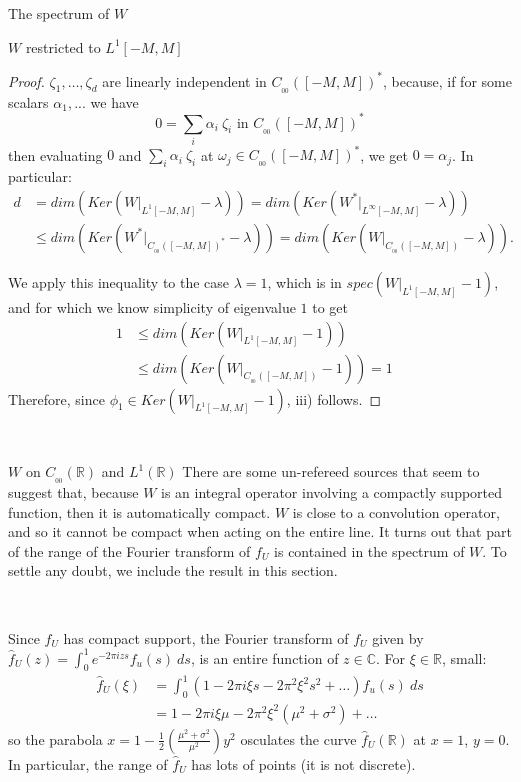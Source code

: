 \documentclass[12pt]{article}
\begin{document}
\begin{section}{The spectrum of $W$ }
\begin{subsection}{$W$ restricted to $L^1[-M,M]$ }
\begin{proof}
$\zeta_1,\dots,\zeta_d $ are linearly independent in $C_{_{00}}([-M,M])^*$, because, if for some scalars $\alpha_1,...$ we have
$$
0 = \sum_i \alpha_i \ \zeta_i \text{ in } C_{_{00}}([-M,M])^*
$$
then evaluating $0$ and $\sum_i \alpha_i \ \zeta_i$ at $\omega_j \in C_{_{00}}([-M,M])^*$, we get $0 = \alpha_j$. In particular:
\begin{align*}
d &= dim \left( Ker \left( W\Big|_{L^1[-M,M]} - \lambda \right) \right) 
= dim \left( Ker \left( W^* \Big|_{L^{\infty}[-M,M]} - \lambda \right) \right)  &\\
&\le dim \left( Ker \left( W^* \Big|_{C_{_{00}}([-M,M])^*} - \lambda \right) \right) 
= dim \left( Ker \left( W\Big|_{C_{_{00}}([-M,M])} - \lambda \right) \right). &
\end{align*}

We apply this inequality to the case $\lambda = 1$, which is in $spec\left( W\Big|_{L^1[-M,M]} - 1 \right)$, and for which we know simplicity of eigenvalue $1$ to get
\begin{align*}
1 &\le dim \left( Ker \left( W\Big|_{L^1[-M,M]} - 1 \right) \right)  &\\
&\le dim \left( Ker \left( W\Big|_{C_{_{00}}([-M,M])} - 1 \right) \right) = 1 &
\end{align*}
Therefore, since $\phi_1 \in Ker \left( W\Big|_{L^1[-M,M]} - 1 \right)$, iii) follows.
\end{proof}



\end{subsection}

\  
\  



\begin{subsection}{$W$ on $C_{_{0\!0}}(\mathbb{R})$ and $L^1(\mathbb{R})$} \label{W_whole_R}
There are some un-refereed sources that seem to suggest that, because $W$ is an integral operator involving a compactly supported function, then it is automatically compact. $W$ is close to a convolution operator, and so it cannot be compact when acting on the entire line. It turns out that part of the range of the Fourier transform of $f_U$ is contained in the spectrum of $W$. To settle any doubt, we include the result in this section.  

\  
\  

Since $f_U$ has compact support, the Fourier transform of $f_U$ given by $\hat{f}_U(z) = \int_0^1 e^{-2 \pi i z s} f_u(s) \ ds$, is an entire function of $z \in \mathbb{C}$. For $\xi \in \mathbb{R}$, small:
\begin{align*}
\hat{f}_U(\xi) &= \int_0^1 (1 - 2 \pi i \xi s - 2 \pi^2 \xi^2 s^2 + \dots) f_u(s) \ ds \\
&= 1 - 2 \pi i \xi \mu - 2 \pi^2 \xi^2 (\mu^2 + \sigma^2) + \dots
\end{align*}
so the parabola $x = 1 - \frac{1}{2} \left( \frac{\mu^2 + \sigma^2}{\mu^2} \right) y^2$ osculates the curve $\hat{f}_U(\mathbb{R})$ at $x=1$, $y=0$. In particular, the range of $\hat{f}_U$ has lots of points (it is not discrete). 


\end{subsection}
\end{section}
\end{document}
